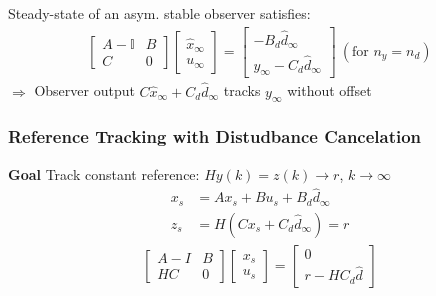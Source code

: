 \begin{lemma}
	Steady-state of an asym. stable
	observer satisfies:
	\begin{align*}
		\begin{bmatrix}
			A-\mathbb{I} & B \\
			C            & 0
		\end{bmatrix}
		\begin{bmatrix}
			\hat{x}_\infty \\
			u_\infty
		\end{bmatrix}
		=
		\begin{bmatrix}
			-B_d \hat{d}_\infty \\
			y_\infty - C_d \hat{d}_\infty
		\end{bmatrix}
		\ (\text{for }n_y = n_d)
	\end{align*}
	$\Rightarrow$ Observer output $C\hat{x}_\infty + C_d \hat{d}_\infty$ tracks $y_\infty$ without offset
\end{lemma}

\subsubsection{Reference Tracking with Distudbance Cancelation}


\textbf{Goal}
Track constant reference:
$Hy(k) = z(k) \to r$, $k\to\infty$
%
\begin{align*}
	x_s & = Ax_s + Bu_s +B_d\hat{d}_\infty  \\
	z_s & = H(Cx_s + C_d\hat{d}_\infty) = r
\end{align*}
\begin{align*}
	\begin{bmatrix}
		A-I & B \\
		HC  & 0
	\end{bmatrix}
	\begin{bmatrix}
		x_s \\
		u_s
	\end{bmatrix}
	=
	\begin{bmatrix}
		0 \\
		r-HC_d\hat{d}
	\end{bmatrix}
\end{align*}
%


